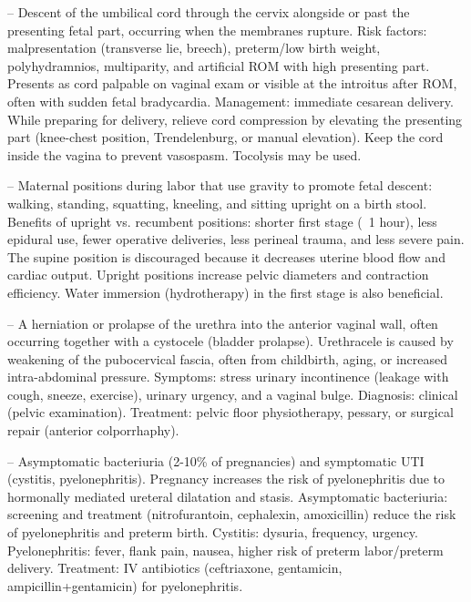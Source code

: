 -- Descent of the umbilical cord through the cervix alongside or past the presenting fetal part, occurring when the membranes rupture. Risk factors: malpresentation (transverse lie, breech), preterm/low birth weight, polyhydramnios, multiparity, and artificial ROM with high presenting part. Presents as cord palpable on vaginal exam or visible at the introitus after ROM, often with sudden fetal bradycardia. Management: immediate cesarean delivery. While preparing for delivery, relieve cord compression by elevating the presenting part (knee-chest position, Trendelenburg, or manual elevation). Keep the cord inside the vagina to prevent vasospasm. Tocolysis may be used.

-- Maternal positions during labor that use gravity to promote fetal descent: walking, standing, squatting, kneeling, and sitting upright on a birth stool. Benefits of upright vs. recumbent positions: shorter first stage (~1 hour), less epidural use, fewer operative deliveries, less perineal trauma, and less severe pain. The supine position is discouraged because it decreases uterine blood flow and cardiac output. Upright positions increase pelvic diameters and contraction efficiency. Water immersion (hydrotherapy) in the first stage is also beneficial.

-- A herniation or prolapse of the urethra into the anterior vaginal wall, often occurring together with a cystocele (bladder prolapse). Urethracele is caused by weakening of the pubocervical fascia, often from childbirth, aging, or increased intra-abdominal pressure. Symptoms: stress urinary incontinence (leakage with cough, sneeze, exercise), urinary urgency, and a vaginal bulge. Diagnosis: clinical (pelvic examination). Treatment: pelvic floor physiotherapy, pessary, or surgical repair (anterior colporrhaphy).

-- Asymptomatic bacteriuria (2-10\% of pregnancies) and symptomatic UTI (cystitis, pyelonephritis). Pregnancy increases the risk of pyelonephritis due to hormonally mediated ureteral dilatation and stasis. Asymptomatic bacteriuria: screening and treatment (nitrofurantoin, cephalexin, amoxicillin) reduce the risk of pyelonephritis and preterm birth. Cystitis: dysuria, frequency, urgency. Pyelonephritis: fever, flank pain, nausea, higher risk of preterm labor/preterm delivery. Treatment: IV antibiotics (ceftriaxone, gentamicin, ampicillin+gentamicin) for pyelonephritis.

